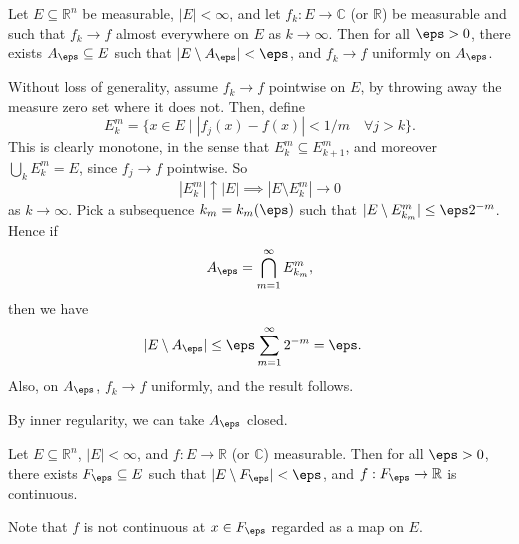 \documentclass[12pt]{article}
\begin{document}
\begin{theorem}[Egorov]
	Let $E \subseteq \mathbb{R}^n$ be measurable, $|E| < \infty$, and let $f_k : E \to \mathbb{C}$ (or $\mathbb{R}$) be measurable and such that $f_k \to f$ almost everywhere on $E$ as $k \to \infty$. Then for all $\eps > 0$, there exists $A_\eps \subseteq E$ such that $|E\setminus A_\eps| < \eps$, and $f_k \to f$ uniformly on $A_\eps$.
\end{theorem}

\begin{proofbox}
	Without loss of generality, assume $f_k \to f$ pointwise on $E$, by throwing away the measure zero set where it does not. Then, define
	\[
		E_k^m = \{x \in E \mid |f_j(x) - f(x)| < 1/m \quad \forall j > k\}.
	\]
	This is clearly monotone, in the sense that $E_k^m \subseteq E_{k+1}^m$, and moreover $\bigcup_k E_k^m = E$, since $f_j \to f$ pointwise. So
	\[
	|E_k^m| \uparrow |E| \implies |E \setminus E_k^m| \to 0
	\]
	as $k \to \infty$. Pick a subsequence $k_m = k_m(\eps)$ such that $|E \setminus E_{k_m}^m| \leq \eps 2^{-m}$. Hence if
	\[
	A_\eps = \bigcap_{m = 1}^{\infty} E_{k_m}^m,
	\]
	then we have
	\begin{align*}
		|E \setminus A_\eps| &\leq \eps \sum_{m = 1}^{\infty} 2^{-m}  = \eps.
	\end{align*}
	Also, on $A_\eps$, $f_k \to f$ uniformly, and the result follows.
\end{proofbox}

\begin{remark}
	By inner regularity, we can take $A_\eps$ closed.
\end{remark}

\begin{theorem}[Lusin]
	Let $E \subseteq \mathbb{R}^n$, $|E| < \infty$, and $f : E \to \mathbb{R}$ (or $\mathbb{C}$) measurable. Then for all $\eps > 0$, there exists $F_\eps \subseteq E$ such that $|E\setminus F_\eps| < \eps$, and $f : F_\eps \to \mathbb{R}$ is continuous.
\end{theorem}

\begin{remark}
	Note that $f$ is not continuous at $x \in F_\eps$ regarded as a map on $E$.
\end{remark}
\end{document}
